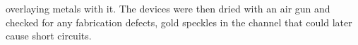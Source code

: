 overlaying metals with it. The devices were then dried with an air gun and checked for any fabrication defects, \eg{} gold speckles in the channel that could later cause short circuits.

